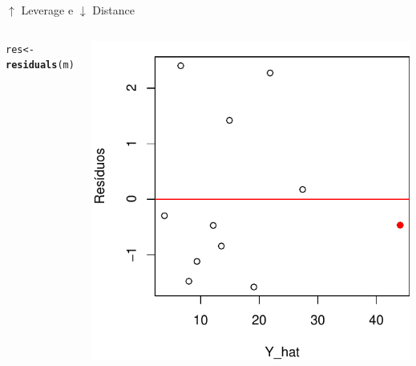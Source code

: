 \documentclass{beamer}\usepackage[]{graphicx}\usepackage[]{color}
\makeatletter
\newcommand{\hlstd}[1]{\textcolor[rgb]{0.345,0.345,0.345}{#1}}%
\newcommand{\hlkwb}[1]{\textcolor[rgb]{0.69,0.353,0.396}{#1}}%
\newcommand{\hlkwd}[1]{\textcolor[rgb]{0.737,0.353,0.396}{\textbf{#1}}}%
\newenvironment{kframe}{%
 \def\at@end@of@kframe{}%
 \ifinner\ifhmode%
  \def\at@end@of@kframe{\end{minipage}}%
  \begin{minipage}{\columnwidth}%
 \fi\fi%
 \def\FrameCommand##1{\hskip\@totalleftmargin \hskip-\fboxsep
 \colorbox{shadecolor}{##1}\hskip-\fboxsep
     \hskip-\linewidth \hskip-\@totalleftmargin \hskip\columnwidth}%
 \MakeFramed {\advance\hsize-\width
   \@totalleftmargin\z@ \linewidth\hsize
   \@setminipage}}%
 {\par\unskip\endMakeFramed%
 \at@end@of@kframe}
\newenvironment{knitrout}{}{} %
\renewenvironment{knitrout}{\setlength{\topsep}{0mm}}{}
\makeatother
\begin{document}
\begin{frame}{$\uparrow$ Leverage e $\downarrow$ Distance}
\begin{columns}[c]
\begin{knitrout}
\end{knitrout}
\pause
{}
\begin{knitrout}\tiny
{}\color{fgcolor}\begin{kframe}
\begin{alltt}
\hlstd{res} \hlkwb{<-} \hlkwd{residuals}\hlstd{(m)}
\end{alltt}
\end{kframe}
\includegraphics[width=1\linewidth]{figure/inf109-1} 

\end{knitrout}

\end{columns}
\end{frame}
\end{document}
